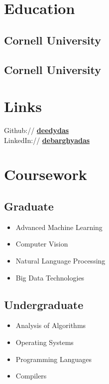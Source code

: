 \documentclass[]{deedy-resume-openfont}
\begin{document}

\begin{minipage}[t]{0.33\textwidth}

\section{Education}

\subsection{Cornell University}

\subsection{Cornell University}

\sectionsep

\section{Links}

Github:// \href{https://github.com/deedydas}{\bf deedydas} \\
LinkedIn:// \href{https://www.linkedin.com/in/debarghyadas}{\bf debarghyadas} \\

\sectionsep

\section{Coursework}

\subsection{Graduate}
\begin{itemize}
  \item Advanced Machine Learning
  \item Computer Vision
  \item Natural Language Processing
  \item Big Data Technologies
\end{itemize}

\subsection{Undergraduate}
\begin{itemize}
  \item Analysis of Algorithms
  \item Operating Systems
  \item Programming Languages
  \item Compilers
\end{itemize}


\end{minipage}
\end{document}

